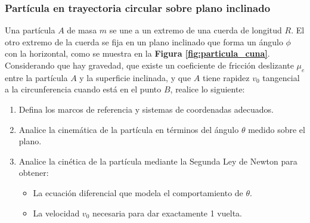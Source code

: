 \subsubsection{Partícula en trayectoria circular sobre plano inclinado}

Una partícula $A$ de masa $m$ se une a un extremo de una cuerda de longitud $R$. El otro extremo de la cuerda se fija en un plano inclinado que forma un ángulo $\phi$ con la horizontal, como se muestra en la \textbf{Figura \ref{fig:particula_cuna}}. Considerando que hay gravedad, que existe un coeficiente de fricción deslizante $\mu_e$ entre la partícula $A$ y la superficie inclinada, y que $A$ tiene rapidez $v_0$ tangencial a la circunferencia cuando está en el punto $B$, realice lo siguiente:

\begin{enumerate}
    \item Defina los marcos de referencia y sistemas de coordenadas adecuados.
    \item Analice la cinemática de la partícula en términos del ángulo $\theta$ medido sobre el plano.
    \item Analice la cinética de la partícula mediante la Segunda Ley de Newton para obtener:
    \begin{itemize}
        \item La ecuación diferencial que modela el comportamiento de $\theta$.
        \item La velocidad $v_0$ necesaria para dar exactamente 1 vuelta.
    \end{itemize}
\end{enumerate}


